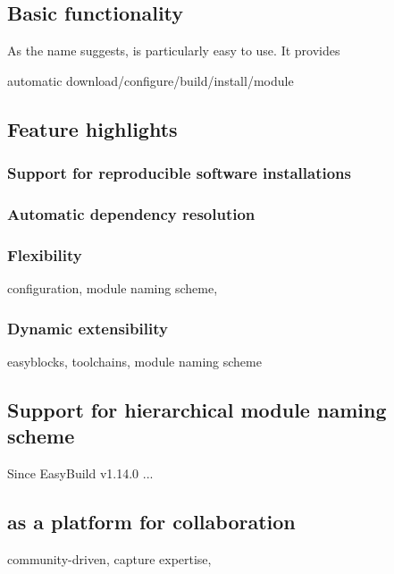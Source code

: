 \subsection{Basic functionality}

As the name suggests, \easybuild{} is particularly easy to use. It provides

automatic download/configure/build/install/module



\subsection{Feature highlights}

\subsubsection{Support for reproducible software installations}
\label{sec:eb_reproducability}

\subsubsection{Automatic dependency resolution}

\subsubsection{Flexibility}
\label{sec:eb_flexible}

configuration, module naming scheme,

\subsubsection{Dynamic extensibility}
\label{sec:eb_extensible}

easyblocks, toolchains, module naming scheme


\subsection{Support for hierarchical module naming scheme}

Since EasyBuild v1.14.0 ...


\subsection{\easybuild{} as a platform for collaboration}

community-driven, capture expertise,

